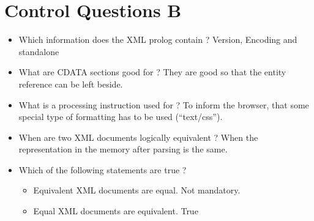 \section{Control Questions B}
\begin{itemize}
\item Which information does the XML prolog contain ?
\subitem Version, Encoding and standalone
\item What are CDATA sections good for ?
\subitem They are good so that the entity reference can be left beside.
\item What is a processing instruction used for ?
\subitem To inform the browser, that some special type of formatting has to be used ("`text/css"').
\item When are two XML documents logically equivalent ?
\subitem When the representation in the memory after parsing is the same.
\item Which of the following statements are true ?
\subitem \begin{itemize}
\item Equivalent XML documents are equal.
\subitem Not mandatory.
\item Equal XML documents are equivalent.
\subitem True
\end{itemize}
\end{itemize}
